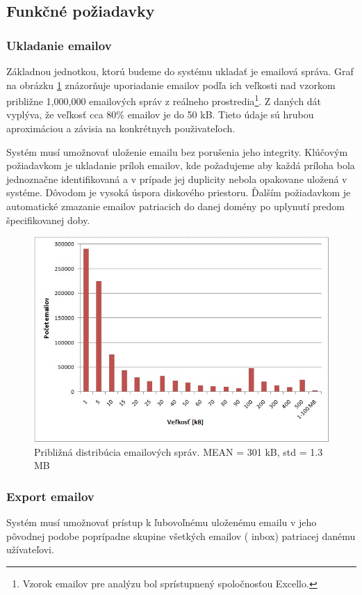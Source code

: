 \documentclass[11pt,twoside,a4paper]{book}
\begin{document}
\subsection{Funkčné požiadavky}

\subsubsection*{Ukladanie emailov}
Základnou jednotkou, ktorú budeme do systému ukladať je emailová správa. Graf na obrázku \ref{fig:emailHist} znázorňuje uporiadanie emailov podľa ich veľkosti nad vzorkom približne 1,000,000 emailových správ z reálneho prostredia\footnote{Vzorok emailov pre analýzu bol sprístupnený spoločnosťou Excello.}. Z daných dát vyplýva, že veľkosť cca 80\% emailov je do 50 kB. Tieto údaje sú hrubou aproximáciou a závisia na konkrétnych použivateľoch.

Systém musí umožnovať uloženie emailu bez porušenia jeho integrity. Klúčovým požiadavkom je ukladanie príloh emailov, kde požadujeme aby každá príloha bola jednoznačne identifikovaná a v prípade jej duplicity nebola opakovane uložená v systéme. Dôvodom je vysoká úspora diskového priestoru. Ďalším požiadavkom je automatické zmazanie emailov patriacich do danej domény po uplynutí predom špecifikovanej doby.

\begin{figure}[h]
 \centering
 \includegraphics[width=12cm]{./figures/emailsHist.png}
 \caption{Približná distribúcia emailových správ. MEAN = 301 kB, std = 1.3 MB}
 \label{fig:emailHist}
\end{figure}


\subsubsection*{Export emailov}
Systém musí umožnovať prístup k ľubovoľnému uloženému emailu v jeho pôvodnej podobe poprípadne skupine všetkých emailov ( inbox) patriacej danému užívateľovi.
\end{document}
